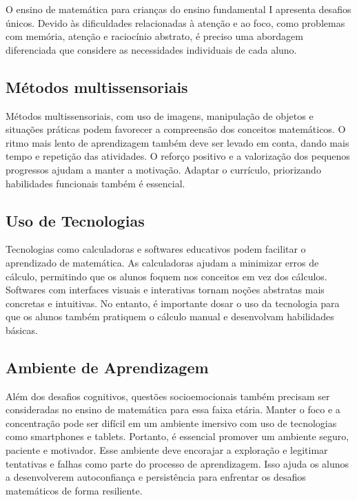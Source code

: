 O ensino de matemática para crianças do ensino fundamental I apresenta desafios únicos. Devido às dificuldades relacionadas à atenção e ao foco, como problemas com memória, atenção e raciocínio abstrato, é preciso uma abordagem diferenciada que considere as necessidades individuais de cada aluno.


\subsection{Métodos multissensoriais}

Métodos multissensoriais, com uso de imagens, manipulação de objetos e situações práticas podem favorecer a compreensão dos conceitos matemáticos. O ritmo mais lento de aprendizagem também deve ser levado em conta, dando mais tempo e repetição das atividades. O reforço positivo e a valorização dos pequenos progressos ajudam a manter a motivação. Adaptar o currículo, priorizando habilidades funcionais também é essencial. 

\subsection{Uso de Tecnologias}

 Tecnologias como calculadoras e softwares educativos podem facilitar o aprendizado de matemática. As calculadoras ajudam a minimizar erros de cálculo, permitindo que os alunos foquem nos conceitos em vez dos cálculos. Softwares com interfaces visuais e interativas tornam noções abstratas mais concretas e intuitivas. No entanto, é importante dosar o uso da tecnologia para que os alunos também pratiquem o cálculo manual e desenvolvam habilidades básicas.

\subsection{Ambiente de Aprendizagem}

Além dos desafios cognitivos, questões socioemocionais também precisam ser consideradas no ensino de matemática para essa faixa etária. Manter o foco e a concentração pode ser difícil em um ambiente imersivo com uso de tecnologias como smartphones e tablets. Portanto, é essencial promover um ambiente seguro, paciente e motivador. Esse ambiente deve encorajar a exploração e legitimar tentativas e falhas como parte do processo de aprendizagem. Isso ajuda os alunos a desenvolverem autoconfiança e persistência para enfrentar os desafios matemáticos de forma resiliente.

